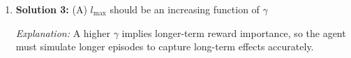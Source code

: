 \begin{example}
\begin{enumerate}
        \item \textbf{Solution 3:} (A) $l_{\max}$ should be an increasing function of $\gamma$

        \textit{Explanation:} A higher $\gamma$ implies longer-term reward importance, so the agent must simulate longer episodes to capture long-term effects accurately.
    
    \end{enumerate}
\end{example}